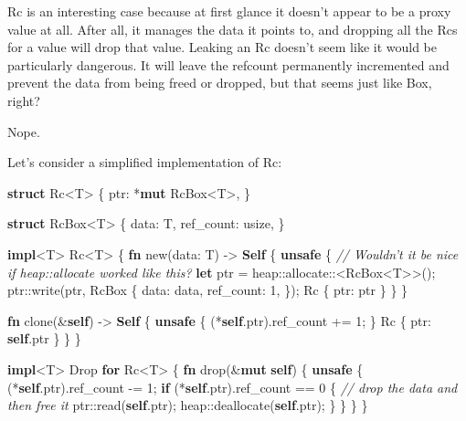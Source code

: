 \documentclass[a4paper,]{book}
\newenvironment{Shaded}{\begin{snugshade}}{\end{snugshade}}
\newcommand{\KeywordTok}[1]{\textcolor[rgb]{0.13,0.29,0.53}{\textbf{{#1}}}}
\newcommand{\DataTypeTok}[1]{\textcolor[rgb]{0.13,0.29,0.53}{{#1}}}
\newcommand{\DecValTok}[1]{\textcolor[rgb]{0.00,0.00,0.81}{{#1}}}
\newcommand{\CommentTok}[1]{\textcolor[rgb]{0.56,0.35,0.01}{\textit{{#1}}}}
\newcommand{\BuiltInTok}[1]{{#1}}
\newcommand{\NormalTok}[1]{{#1}}
\begin{document}
Rc is an interesting case because at first glance it doesn't appear to
be a proxy value at all. After all, it manages the data it points to,
and dropping all the Rcs for a value will drop that value. Leaking an Rc
doesn't seem like it would be particularly dangerous. It will leave the
refcount permanently incremented and prevent the data from being freed
or dropped, but that seems just like Box, right?

Nope.

Let's consider a simplified implementation of Rc:

\begin{Shaded}
\begin{Highlighting}[]
\KeywordTok{struct} \NormalTok{Rc<T> \{}
    \NormalTok{ptr: *}\KeywordTok{mut} \NormalTok{RcBox<T>,}
\NormalTok{\}}

\KeywordTok{struct} \NormalTok{RcBox<T> \{}
    \NormalTok{data: T,}
    \NormalTok{ref_count: }\DataTypeTok{usize}\NormalTok{,}
\NormalTok{\}}

\KeywordTok{impl}\NormalTok{<T> Rc<T> \{}
    \KeywordTok{fn} \NormalTok{new(data: T) -> }\KeywordTok{Self} \NormalTok{\{}
        \KeywordTok{unsafe} \NormalTok{\{}
            \CommentTok{// Wouldn't it be nice if heap::allocate worked like this?}
            \KeywordTok{let} \NormalTok{ptr = heap::allocate::<RcBox<T>>();}
            \NormalTok{ptr::write(ptr, RcBox \{}
                \NormalTok{data: data,}
                \NormalTok{ref_count: }\DecValTok{1}\NormalTok{,}
            \NormalTok{\});}
            \NormalTok{Rc \{ ptr: ptr \}}
        \NormalTok{\}}
    \NormalTok{\}}

    \KeywordTok{fn} \NormalTok{clone(&}\KeywordTok{self}\NormalTok{) -> }\KeywordTok{Self} \NormalTok{\{}
        \KeywordTok{unsafe} \NormalTok{\{}
            \NormalTok{(*}\KeywordTok{self}\NormalTok{.ptr).ref_count += }\DecValTok{1}\NormalTok{;}
        \NormalTok{\}}
        \NormalTok{Rc \{ ptr: }\KeywordTok{self}\NormalTok{.ptr \}}
    \NormalTok{\}}
\NormalTok{\}}

\KeywordTok{impl}\NormalTok{<T> }\BuiltInTok{Drop} \KeywordTok{for} \NormalTok{Rc<T> \{}
    \KeywordTok{fn} \NormalTok{drop(&}\KeywordTok{mut} \KeywordTok{self}\NormalTok{) \{}
        \KeywordTok{unsafe} \NormalTok{\{}
            \NormalTok{(*}\KeywordTok{self}\NormalTok{.ptr).ref_count -= }\DecValTok{1}\NormalTok{;}
            \KeywordTok{if} \NormalTok{(*}\KeywordTok{self}\NormalTok{.ptr).ref_count == }\DecValTok{0} \NormalTok{\{}
                \CommentTok{// drop the data and then free it}
                \NormalTok{ptr::read(}\KeywordTok{self}\NormalTok{.ptr);}
                \NormalTok{heap::deallocate(}\KeywordTok{self}\NormalTok{.ptr);}
            \NormalTok{\}}
        \NormalTok{\}}
    \NormalTok{\}}
\NormalTok{\}}
\end{Highlighting}
\end{Shaded}
\end{document}
